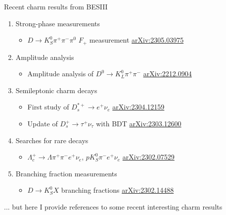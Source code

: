 \documentclass{beamer}
\begin{document}
\begin{frame}{Recent charm results from BESIII}
  \begin{enumerate}
    \item{Strong-phase measurements}
    \begin{itemize}
      \item{$D\to K_S^0\pi^+\pi^-\pi^0$ $F_+$ measurement \href{https://arxiv.org/abs/2305.03975}{arXiv:2305.03975}}
    \end{itemize}
    \item{Amplitude analysis}
    \begin{itemize}
      \item{Amplitude analysis of $D^0\to K_L^0\pi^+\pi^-$ \href{https://arxiv.org/abs/2212.09048}{arXiv:2212.0904}}
    \end{itemize}
    \item{Semileptonic charm decays}
    \begin{itemize}
      \item{First study of $D_s^{*+}\to e^+\nu_e$ \href{https://arxiv.org/abs/2304.12159}{arXiv:2304.12159}}
      \item{Update of $D_s^+\to\tau^+\nu_\tau$ with BDT \href{https://arxiv.org/abs/2303.12600}{arXiv:2303.12600}}
    \end{itemize}
    \item{Searches for rare decays}
    \begin{itemize}
      \item{$\Lambda_c^+\to\Lambda\pi^+\pi^-e^+\nu_e$, $pK_S^0\pi^-e^+\nu_e$ \href{https://arxiv.org/abs/2302.07529}{arXiv:2302.07529}}
    \end{itemize}
    \item{Branching fraction measurements}
    \begin{itemize}
      \item{$D\to K_S^0X$ branching fractions \href{https://arxiv.org/abs/2302.14488}{arXiv:2302.14488}}
    \end{itemize}
  \end{enumerate}
  \begin{center}
    {\Large ... but here I provide references to some recent interesting charm results}
  \end{center}
\end{frame}
\end{document}
